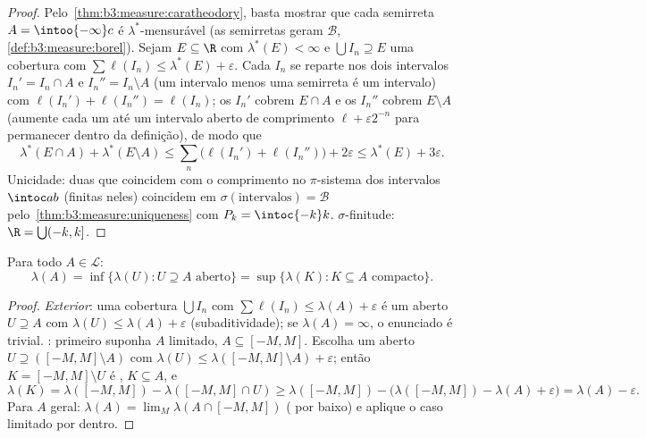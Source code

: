 \begin{proof}
Pelo~\cref{thm:b3:measure:caratheodory}, basta mostrar que cada semirreta $A = \intoo{-\infty}c$ é
$\lambda^*$-mensurável (as semirretas geram $\mathcal B$, \cref{def:b3:measure:borel}). Sejam
$E \subseteq \R$ com $\lambda^*(E) < \infty$ e $\bigcup I_n \supseteq E$ uma cobertura com $\sum\ell(I_n) \leq \lambda^*(E) + \varepsilon$. Cada $I_n$ se
reparte nos dois intervalos $I_n' = I_n \cap A$ e $I_n'' = I_n\setminus A$ (um intervalo menos uma
semirreta é um intervalo) com $\ell(I_n') + \ell(I_n'') = \ell(I_n)$; os $I_n'$ cobrem $E \cap A$ e os
$I_n''$ cobrem $E \setminus A$ (aumente cada um até um intervalo aberto de
comprimento $\ell +
\varepsilon2^{-n}$ para permanecer dentro da definição), de modo que
\[
\lambda^*(E\cap A) + \lambda^*(E\setminus A)
\leq \sum_n\bigl(\ell(I_n') + \ell(I_n'')\bigr) + 2\varepsilon
\leq \lambda^*(E) + 3\varepsilon .
\]
Unicidade: duas  que coincidem com o comprimento no
$\pi$-sistema dos intervalos $\intoc ab$ (finitas neles) coincidem em
$\sigma(\text{intervalos}) = \mathcal B$ pelo~\cref{thm:b3:measure:uniqueness} com $P_k = \intoc{-k}k$. $\sigma$-finitude: $\R = \bigcup(-k, k]$.
\end{proof}

\begin{theorem}[Regularidade]\label{thm:b3:measure:regularity}
Para todo $A \in \mathcal L$:
\[
\lambda(A) = \inf\{\lambda(U) : U \supseteq A \text{ aberto}\}
= \sup\{\lambda(K) : K \subseteq A \text{ compacto}\}.
\]
\end{theorem}

\begin{proof}
\emph{Exterior}: uma cobertura $\bigcup I_n$ com $\sum\ell(I_n) \leq
\lambda(A) + \varepsilon$ é um aberto $U \supseteq A$ com
$\lambda(U) \leq \lambda(A) + \varepsilon$ (subaditividade); se $\lambda(A) = \infty$, o enunciado é trivial.
\emph{}: primeiro suponha $A$ limitado, $A \subseteq [-M, M]$. Escolha um
aberto $U \supseteq ([-M,M]\setminus A)$ com $\lambda(U) \leq
\lambda([-M,M]\setminus A) + \varepsilon$; então $K = [-M,
M]\setminus U$ é , $K \subseteq A$, e
\[
\lambda(K) = \lambda([-M,M]) - \lambda([-M,M]\cap U)
\geq \lambda([-M,M]) - \bigl(\lambda([-M,M]) - \lambda(A) +
\varepsilon\bigr) = \lambda(A) - \varepsilon .
\]
Para $A$ geral: $\lambda(A) = \lim_M\lambda(A\cap[-M,M])$ ( por baixo) e aplique o caso
limitado por dentro.
\end{proof}

